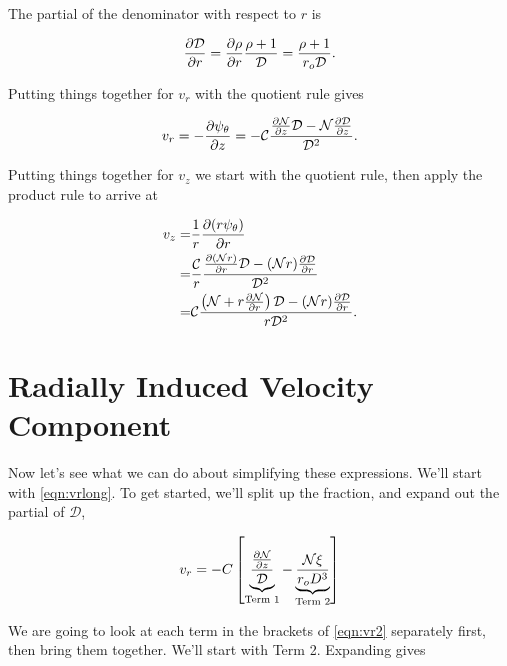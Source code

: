 \noindent The partial of the denominator with respect to \(r\) is

\begin{equation}
    \frac{\partial \mathcal{D}}{\partial r} = \frac{\partial \rho}{\partial r}\frac{\rho+1}{\mathcal{D}} = \frac{\rho+1}{r_o\mathcal{D}}.
\end{equation}

\noindent Putting things together for \(v_r\) with the quotient rule gives

\begin{equation}
    \label{eqn:vrlong}
        v_r = -\frac{\partial \psi_\theta}{\partial z} = -\mathcal{C}\frac{\frac{\partial \mathcal{N}}{\partial z}\mathcal{D} - \mathcal{N}\frac{\partial \mathcal{D}}{\partial z}}{\mathcal{D}^2}.
\end{equation}

\noindent Putting things together for \(v_z\) we start with the quotient rule, then apply the product rule to arrive at

\begin{equation}
    \label{eqn:vzlong}
    \begin{aligned}
        v_z =& \frac{1}{r}\frac{\partial (r\psi_\theta)}{\partial r} \\
        =& \frac{\mathcal{C}}{r}\frac{\frac{\partial (\mathcal{N}r)}{\partial r}\mathcal{D} - (\mathcal{N}r)\frac{\partial \mathcal{D}}{\partial r}}{\mathcal{D}^2} \\
        =& \mathcal{C}\frac{\left(\mathcal{N} + r\frac{\partial \mathcal{N}}{\partial r}\right)\mathcal{D} - (\mathcal{N}r)\frac{\partial \mathcal{D}}{\partial r}}{r\mathcal{D}^2}.
\end{aligned}
\end{equation}

\section{Radially Induced Velocity Component}

Now let's see what we can do about simplifying these expressions.
%
We'll start with \cref{eqn:vrlong}.
%
To get started, we'll split up the fraction, and expand out the partial of \(\mathcal{D}\),

\begin{equation}
    \label{eqn:vr2}
    v_r  = -C \left[ \underbrace{\frac{\pd{\mathcal{N}}{z}}{\mathcal{D}}}_\text{Term 1}
    -\underbrace{\frac{\mathcal{N}\xi}{r_oD^3}}_\text{Term 2}\right]
\end{equation}

\noindent We are going to look at each term in the brackets of \cref{eqn:vr2} separately first, then bring them together.
%
We'll start with Term 2.
%
Expanding gives

